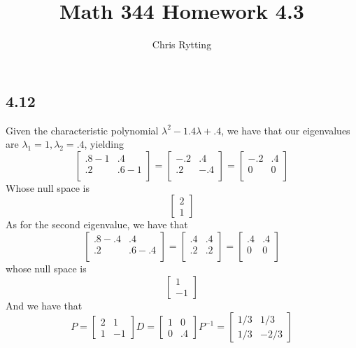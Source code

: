 \documentclass[letterpaper,12pt]{article}
\theoremstyle{definition}
\begin{document}
\title{Math 344 Homework 4.3}
\author{Chris Rytting}
\maketitle

\subsection*{4.12}
Given the characteristic polynomial $\lambda^2- 1.4 \lambda + .4$, we have that our eigenvalues are $\lambda_1 = 1, \lambda_2 = .4$, yielding
\[ 
\begin{bmatrix}
   .8 -1 & .4 \\  
   .2 & .6 - 1 \\  
\end{bmatrix}
=
\begin{bmatrix}
   -.2 & .4 \\  
   .2 & -.4  \\  
\end{bmatrix}
=
\begin{bmatrix}
   -.2 & .4 \\  
   0 & 0  \\  
\end{bmatrix}
\]
Whose null space is 
\[ 
\begin{bmatrix}
    2 \\ 1
\end{bmatrix}
\] 
As for the second eigenvalue, we have that
\[ 
\begin{bmatrix}
   .8 -.4 & .4 \\  
   .2 & .6 - .4 \\  
\end{bmatrix}
=
\begin{bmatrix}
   .4 & .4 \\  
   .2 & .2 \\  
\end{bmatrix}
=
\begin{bmatrix}
   .4 & .4 \\  
   0 & 0\\  
\end{bmatrix}
\]
whose null space is
\[ 
\begin{bmatrix}
    1 \\ -1
\end{bmatrix}
\]
And we have that 
\[
P = 
\begin{bmatrix}
    2 & 1 \\
    1 & -1
\end{bmatrix}
D = 
\begin{bmatrix}
    1 & 0 \\
    0 & .4
\end{bmatrix}
P^{-1} = 
\begin{bmatrix}
    1/3 & 1/3 \\
    1/3 & -2/3
\end{bmatrix}
\]
\end{document}
